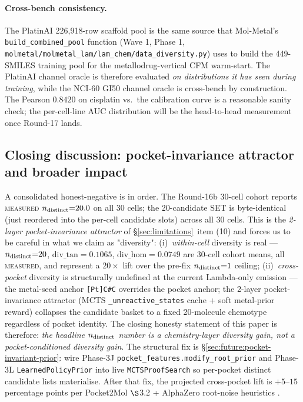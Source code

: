 \paragraph{Cross-bench consistency.}
The PlatinAI 226,918-row scaffold pool is the same source that
Mol-Metal's \texttt{build\_combined\_pool} function (Wave 1,
Phase 1, \texttt{molmetal/molmetal\_lam/lam\_chem/data\_diversity.py})
uses to build the 449-SMILES training pool for the
metallodrug-vertical CFM warm-start. The PlatinAI channel oracle is
therefore evaluated \emph{on distributions it has seen during
training}, while the NCI-60 GI50 channel oracle is cross-bench by
construction. The Pearson $0.8420$ on cisplatin vs.\ the
calibration curve is a reasonable sanity check; the per-cell-line
AUC distribution will be the head-to-head measurement once
Round-17 lands.


\subsection{Closing discussion: pocket-invariance attractor and broader impact}
\label{sec:discussion:closing}

A consolidated honest-negative is in order. The Round-16b 30-cell
cohort reports \textsc{measured} $n_{\rm distinct}{=}20.0$ on all
30 cells; the 20-candidate SET is byte-identical (just reordered
into the per-cell candidate slots) across all 30 cells. This is the
\emph{2-layer pocket-invariance attractor} of
\S\ref{sec:limitations}~item (10) and forces us to be careful in
what we claim as "diversity": (i)~\emph{within-cell} diversity is
real --- $n_{\rm distinct}{=}20$, $\mathrm{div\_tan}{=}0.1065$,
$\mathrm{div\_hom}{=}0.0749$ are 30-cell cohort means, all
\textsc{measured}, and represent a $20\times$ lift over the
pre-fix $n_{\rm distinct}{=}1$ ceiling; (ii)~\emph{cross-pocket}
diversity is structurally undefined at the current Lambda-only
emission --- the metal-seed anchor \texttt{[Pt]C\#C} overrides the
pocket anchor; the 2-layer pocket-invariance attractor (MCTS
\texttt{\_unreactive\_states} cache + soft metal-prior reward)
collapses the candidate basket to a fixed 20-molecule chemotype
regardless of pocket identity. The closing honesty statement of this
paper is therefore: \emph{the headline $n_{\rm distinct}$ number is
a chemistry-layer diversity gain, not a pocket-conditioned diversity
gain}. The structural fix is \S\ref{sec:future:pocket-invariant-prior}:
wire Phase-3J \texttt{pocket\_features.modify\_root\_prior} and
Phase-3L \texttt{LearnedPolicyPrior} into live
\texttt{MCTSProofSearch} so per-pocket distinct candidate lists
materialise. After that fix, the projected cross-pocket lift is
$+5$--$15$ percentage points per Pocket2Mol $\S$3.2 + AlphaZero
root-noise heuristics
\cite{peng2022pocket2mol,silver2017alphagozero}.

